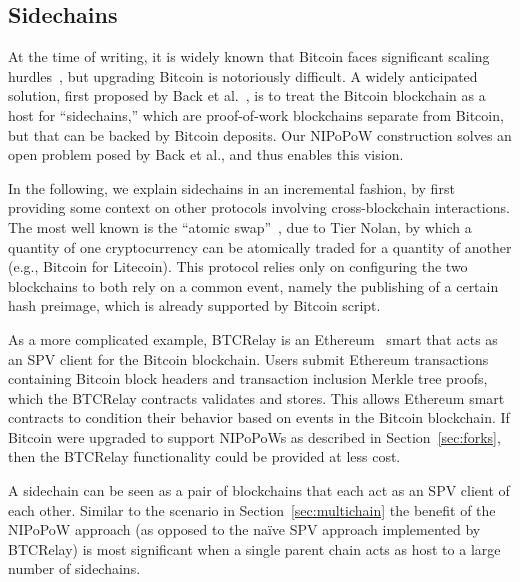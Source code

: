 \subsection{Sidechains}
\label{sec:sidechains}
At the time of writing, it is widely known that Bitcoin faces significant scaling hurdles~\cite{onscaling}, but upgrading Bitcoin is notoriously difficult.
A widely anticipated solution, first proposed by Back et al.~\cite{sidechains}, is to treat the Bitcoin blockchain as a host for ``sidechains,'' which are proof-of-work blockchains separate from Bitcoin, but that can be backed by Bitcoin deposits. Our NIPoPoW construction solves an open problem posed by Back et al., and thus enables this vision.

In the following, we explain sidechains in an incremental fashion, by first providing some context on other protocols involving cross-blockchain interactions. The most well known is the ``atomic swap''~\cite{tiernolan}, due to Tier Nolan, by which a quantity of one cryptocurrency can be atomically traded for a quantity of another (e.g., Bitcoin for Litecoin). This protocol relies only on configuring the two blockchains to both rely on a common event, namely the publishing of a certain hash preimage, which is already supported by Bitcoin script.

As a more complicated example, BTCRelay is an Ethereum~\cite{ethereum} smart  that acts as an SPV client for the Bitcoin blockchain.
Users submit Ethereum transactions containing Bitcoin block headers and transaction inclusion Merkle tree proofs, which the BTCRelay contracts validates and stores. This allows Ethereum smart contracts to condition their behavior based on events in the Bitcoin blockchain.
If Bitcoin were upgraded to support NIPoPoWs as described in Section~\ref{sec:forks}, then the BTCRelay functionality could be provided at less cost.

A sidechain can be seen as a pair of blockchains that each act as an SPV client of each other. Similar to the scenario in Section~\ref{sec:multichain} the benefit of the NIPoPoW approach (as opposed to the na\"ive SPV approach implemented by BTCRelay) is most significant when a single parent chain acts as host to a large number of sidechains.
